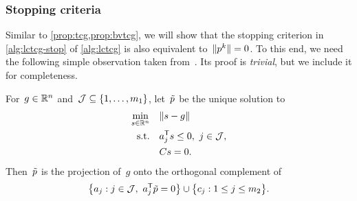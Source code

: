 \subsubsection{Stopping criteria}

Similar to \cref{prop:tcg,prop:bvtcg}, we will show that the stopping criterion
in \cref{alg:lctcg-stop} of \cref{alg:lctcg} is also equivalent to~$\norm{\pstep[k]} = 0$.
To this end, we need the following simple observation taken from~\cite[\S~3]{Powell_2015}.
Its proof is \emph{trivial}, but we include it for completeness.

\begin{lemma}
    \label{lem:lctcg}
    For~$g \in \mathbb{R}^n$ and~$\mathcal{J} \subseteq \{1, \dots, m_1\}$, let~$\tilde{\pstep}$ be the unique solution to
    \begin{subequations}
        \label{eq:lctcg-lemma}
        \begin{align}
            \min_{\sstep \in \R^n}  & \quad \norm{\sstep - g}\\
            \text{s.t.}             & \quad a_j^{\T} \sstep \le 0, ~ j \in \mathcal{J},\\
                                    & \quad C \sstep = 0.
        \end{align}
    \end{subequations}
    Then~$\tilde{\pstep}$ is the projection of~$g$ onto the orthogonal complement of
    \begin{equation*}
        \set[\big]{a_j : j \in \mathcal{J}, ~ a_j^{\T} \tilde{\pstep} = 0} \cup \set[\big]{c_j : 1 \le j \le m_2}.
    \end{equation*}
\end{lemma}

